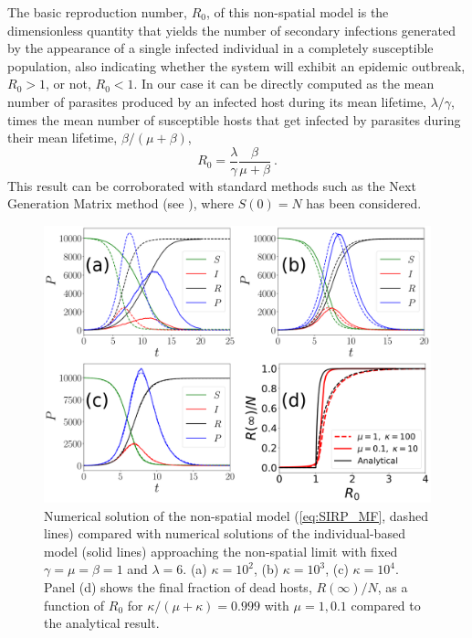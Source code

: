 The basic reproduction number, $R_0$, of this non-spatial model is the
dimensionless quantity that yields the number of secondary infections generated
by the appearance of a single infected individual in a completely susceptible
population, also indicating whether the system will exhibit an epidemic
outbreak, $R_0>1$, or not, $R_0<1$.
In our case it can be directly computed as the mean number of parasites
produced by an infected host during its mean lifetime, $\lambda/\gamma$, times
the mean number of susceptible hosts that get infected by parasites during
their mean lifetime, $\beta/(\mu+\beta)$,
\begin{equation}\label{eq:R0_MF}
    R_0=\frac{\lambda}{\gamma}\frac{\beta}{\mu+\beta} \ .
\end{equation}
This result can be corroborated with standard methods such as the Next
Generation Matrix method \cite{Diekmann2010} (see \cite{GimenezRomero2021}),
where $S(0)=N$ has been considered.

\begin{figure}[H]
    \centering
    \includegraphics[width=\columnwidth]{Figures/MF_comparison.png}
    \caption[Comparison between the non-spatial model and the individual-based
        model in the high mobility limit]{Numerical solution of the non-spatial
        model (\cref{eq:SIRP_MF}, dashed lines) compared with numerical
        solutions of the individual-based model (solid lines) approaching the
        non-spatial limit with fixed $\gamma=\mu=\beta=1$ and $\lambda=6$. (a)
        $\kappa=10^2$, (b) $\kappa=10^3$, (c) $\kappa=10^4$. Panel (d) shows
        the final fraction of dead hosts, $R(\infty)/N$, as a function of $R_0$
        for $\kappa/(\mu+\kappa)=0.999$ with $\mu=1,0.1$ compared to the
        analytical result.}
    \label{fig:MF_limit}
\end{figure}

